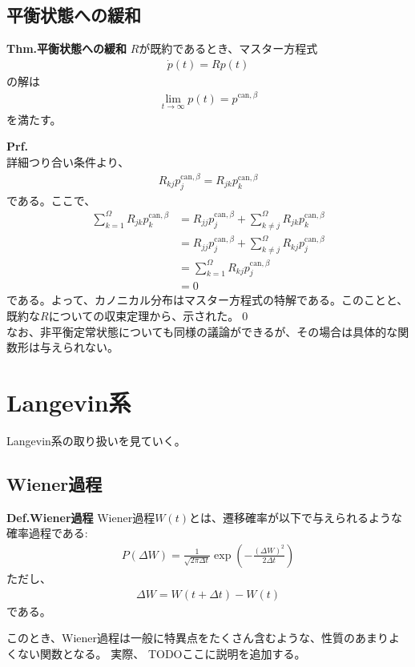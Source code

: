 \documentclass[a4paper,11pt]{jsarticle}
\numberwithin{equation}{section}
\begin{document}
\subsection{平衡状態への緩和}
\begin{itembox}[l]{\textbf{Thm.平衡状態への緩和}}
  $R$が既約であるとき、マスター方程式
  \begin{align}
    \dot{p}(t) = Rp(t)
  \end{align}
  の解は
  \begin{align}
    \lim_{t \to \infty}p(t) = p^{\text{can},\beta}
  \end{align}
  を満たす。
\end{itembox}
\textbf{Prf.}\\
詳細つり合い条件より、
\begin{align}
  R_{kj}p_j^{\text{can},\beta} = R_{jk}p_k^{\text{can},\beta}
\end{align}
である。ここで、
\begin{align}
  \sum_{k=1}^{\Omega}R_{jk} p_k^{\text{can},\beta} &= R_{jj}p_j^{\text{can},\beta} + \sum_{k \neq j}^{\Omega}R_{jk}p_k^{\text{can},\beta}\\
  &= R_{jj}p_j^{\text{can},\beta} + \sum_{k \neq j}^{\Omega}R_{kj}p_j^{\text{can},\beta}\\
  &= \sum_{k=1}^{\Omega}R_{kj}p_j^{\text{can},\beta}\\
  &= 0
\end{align}
である。よって、カノニカル分布はマスター方程式の特解である。このことと、既約な$R$についての収束定理から、示された。\qed\\
なお、非平衡定常状態についても同様の議論ができるが、その場合は具体的な関数形は与えられない。\\

\section{Langevin系}
Langevin系の取り扱いを見ていく。

\subsection{Wiener過程}

\begin{itembox}[l]{\textbf{Def.Wiener過程}}
  Wiener過程$W(t)$とは、遷移確率が以下で与えられるような確率過程である:
  \begin{align}
    P(\Delta W) = \frac{1}{\sqrt{2\pi \Delta t}}\exp(-\frac{(\Delta W)^2}{2\Delta t})
  \end{align}
  ただし、
  \begin{align}
    \Delta W = W(t + \Delta t) - W(t)
  \end{align}
  である。
\end{itembox}
このとき、Wiener過程は一般に特異点をたくさん含むような、性質のあまりよくない関数となる。
実際、
TODOここに説明を追加する。
\end{document}

